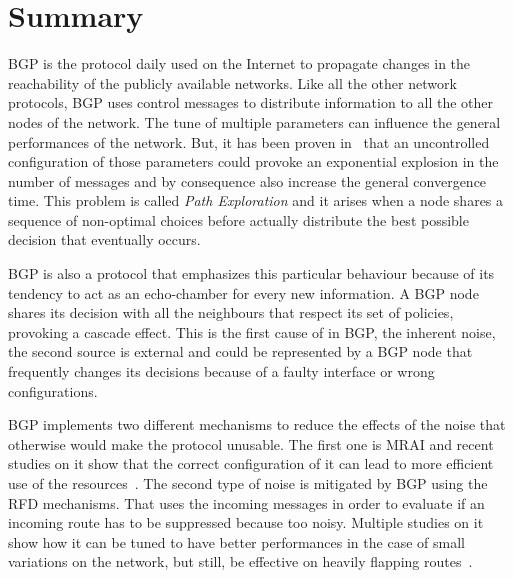 \chapter*{Summary} %
\label{cha:summary}



\ac{BGP} is the protocol daily used on the Internet to propagate changes in the
reachability of the publicly available networks.
Like all the other network protocols, \ac{BGP} uses control messages to distribute
information to all the other nodes of the network.
The tune of multiple parameters can influence the general performances of the
network.
But, it has been proven in~\cite{fabrikant2011there} that an uncontrolled configuration
of those parameters could provoke an exponential explosion in the number of messages
and by consequence also increase the general convergence time.
This problem is called \textit{Path Exploration} and it arises when a node shares
a sequence of non-optimal choices before actually distribute the best possible
decision that eventually occurs.

\ac{BGP} is also a protocol that emphasizes this particular behaviour because of
its tendency to act as an echo-chamber for every new information.
A \ac{BGP} node shares its decision with all the neighbours that respect
its set of policies, provoking a cascade effect.
This is the first cause of  in \ac{BGP}, the inherent noise, the second
source is external and could be represented by a \ac{BGP} node that frequently
changes its decisions because of a faulty interface or wrong configurations.

\ac{BGP} implements two different mechanisms to reduce the effects of the
noise that otherwise would make the protocol unusable.
The first one is \ac{MRAI} and recent studies on it show that the correct
configuration of it can lead to more efficient use of the
resources~\cite{griffin2001experimental,fabrikant2011there,deshpande2004impact,milani2020improving}.
The second type of noise is mitigated by \ac{BGP} using the \ac{RFD} mechanisms.
That uses the incoming messages in order to evaluate if an incoming route has
to be suppressed because too noisy.
Multiple studies on it show how it can be tuned to have better performances in
the case of small variations on the network, but still, be effective on heavily
flapping routes~\cite{mao2002route,gray2020bgp,rfc7196}.

